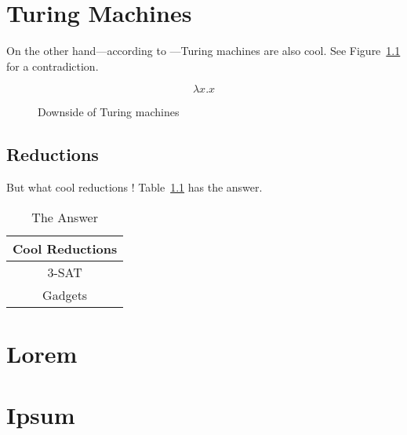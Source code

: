 \documentclass[doublespace]{rackham-thesis}
\begin{document}
\chapter{Turing Machines}

On the other hand---according to \textcite{turing}---Turing machines are also cool.
See Figure~\ref{fig:comp} for a contradiction.
\lipsum[4]

\begin{figure}
    \centering
    {
        \Huge
        \begin{equation*}
            \lambda x . x
        \end{equation*}
    }
    \caption{Downside of Turing machines}
    \label{fig:comp}
\end{figure}


\section{Reductions}

But what cool reductions \parencite{cook}!
Table~\ref{tab:red} has the answer.
\lipsum[5-7]

\begin{table}
    \centering
    \caption{The Answer}
    \begin{tabular}{c} \toprule
        Cool Reductions \\ \midrule
        3-SAT \\
        Gadgets \\ \bottomrule
    \end{tabular}
    \label{tab:red}
\end{table}

\appendix

\chapter{Lorem}
\lipsum[8-13]

\chapter{Ipsum}
\lipsum[14]

\printbibliography
\end{document}

